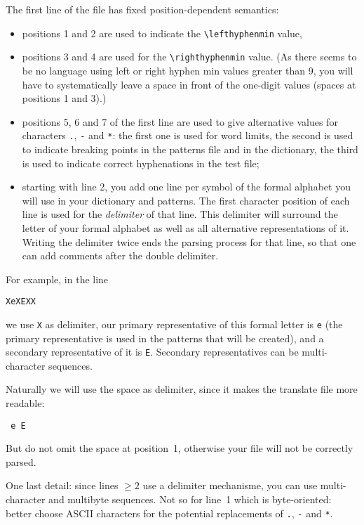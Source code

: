 \documentclass{article}
\begin{document}
The first line of the file has fixed position-dependent semantics: 
\begin{itemize}
\item positions 1 and 2 are used to indicate the \verb=\lefthyphenmin= value,
\item positions 3 and 4 are used for the \verb=\righthyphenmin= value. (As there seems to be no language using left or right hyphen min values greater than 9, you will have to systematically leave a space in front of the one-digit values (spaces at positions 1 and 3).)
\item positions 5, 6 and 7 of the first line are used to give alternative values for characters \verb=.=, \verb=-= and \verb=*=: the first one is used for word limits, the second is used to indicate breaking points in the patterns file and in the dictionary, the third is used to indicate correct hyphenations in the test file;

\item starting with line 2, you add one line per symbol of the formal alphabet you will use in your dictionary and patterns. The first character position of each line is used for the \emph{delimiter} of that line. This delimiter will surround the letter of your formal alphabet as well as all alternative representations of it. Writing the delimiter twice ends the parsing process for that line, so that one can add comments after the double delimiter.
\end{itemize}

For example, in the line
\begin{verbatim}
XeXEXX
\end{verbatim}
we use \texttt{X} as delimiter, our primary representative of this formal letter is \texttt{e} (the primary representative is used in the patterns that will be created), and a secondary representative of it is \texttt{E}. Secondary representatives can be multi-character sequences.

Naturally we will use the space as delimiter, since it makes the translate file more readable:
\begin{verbatim}
 e E
\end{verbatim}
But do not omit the space at position~1, otherwise your file will not be correctly parsed.

One last detail: since lines $\geq2$ use a delimiter mechanisme, you can use multi-character and multibyte sequences. Not so for line~1 which is byte-oriented: better choose ASCII characters for the potential replacements of \verb=.=, \verb=-= and \verb=*=.
\end{document}
